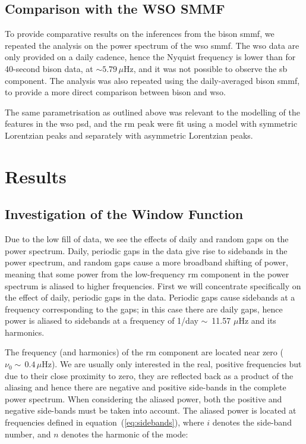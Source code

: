 \subsection{Comparison with the WSO SMMF}

To provide comparative results on the inferences from the \gls{bison} \gls{smmf}, we repeated the analysis on the power spectrum of the \gls{wso} \gls{smmf}. The \gls{wso} data are only provided on a daily cadence, hence the Nyquist frequency is lower than for 40-second \gls{bison} data, at $\sim 5.79 \, \mu\mathrm{Hz}$, and it was not possible to observe the \gls{sb} component. The analysis was also repeated using the daily-averaged \gls{bison} \gls{smmf}, to provide a more direct comparison between \gls{bison} and \gls{wso}.

The same parametrisation as outlined above was relevant to the modelling of the features in the \gls{wso} \gls{psd}, and the \gls{rm} peak were fit using a model with symmetric Lorentzian peaks and separately with asymmetric Lorentzian peaks.


\section{Results}\label{sec:SMMF_reults}

\subsection{Investigation of the Window Function}\label{sec:window_fn}


Due to the low fill of data, we see the effects of daily and random gaps on the power spectrum. Daily, periodic gaps in the data give rise to sidebands in the power spectrum, and random gaps cause a more broadband shifting of power, meaning that some power from the low-frequency \gls{rm} component in the power spectrum is aliased to higher frequencies. First we will concentrate specifically on the effect of daily, periodic gaps in the data. Periodic gaps cause sidebands at a frequency corresponding to the gaps; in this case there are daily gaps, hence power is aliased to sidebands at a frequency of 1/day $\sim$~11.57 $\mu$Hz and its harmonics.

The frequency (and harmonics) of the \gls{rm} component are located near zero ($\nu_0 \sim \,0.4 \, \mu\mathrm{Hz}$). We are usually only interested in the real, positive frequencies but due to their close proximity to zero, they are reflected back as a product of the aliasing and hence there are negative and positive side-bands in the complete power spectrum. When considering the aliased power, both the positive and negative side-bands must be taken into account. The aliased power is located at frequencies defined in equation~(\ref{eq:sidebands}), where $i$ denotes the side-band number, and $n$ denotes the harmonic of the mode:


